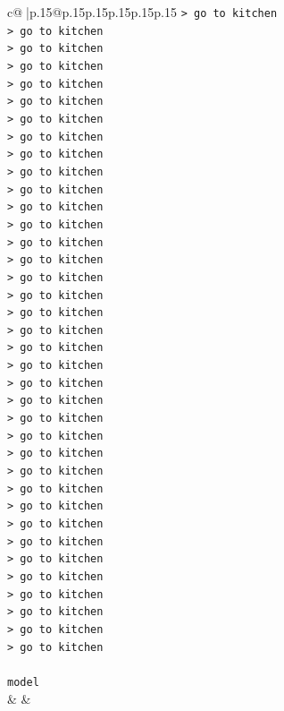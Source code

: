\documentclass{article}
\begin{document}
{\begin{supertabular}{c@{$\;$}|p{.15\linewidth}@{}p{.15\linewidth}p{.15\linewidth}p{.15\linewidth}p{.15\linewidth}p{.15\linewidth}}
{{{\texttt{> go to kitchen} \\
\texttt{> go to kitchen} \\
\texttt{> go to kitchen} \\
\texttt{> go to kitchen} \\
\texttt{> go to kitchen} \\
\texttt{> go to kitchen} \\
\texttt{> go to kitchen} \\
\texttt{> go to kitchen} \\
\texttt{> go to kitchen} \\
\texttt{> go to kitchen} \\
\texttt{> go to kitchen} \\
\texttt{> go to kitchen} \\
\texttt{> go to kitchen} \\
\texttt{> go to kitchen} \\
\texttt{> go to kitchen} \\
\texttt{> go to kitchen} \\
\texttt{> go to kitchen} \\
\texttt{> go to kitchen} \\
\texttt{> go to kitchen} \\
\texttt{> go to kitchen} \\
\texttt{> go to kitchen} \\
\texttt{> go to kitchen} \\
\texttt{> go to kitchen} \\
\texttt{> go to kitchen} \\
\texttt{> go to kitchen} \\
\texttt{> go to kitchen} \\
\texttt{> go to kitchen} \\
\texttt{> go to kitchen} \\
\texttt{> go to kitchen} \\
\texttt{> go to kitchen} \\
\texttt{> go to kitchen} \\
\texttt{> go to kitchen} \\
\texttt{> go to kitchen} \\
\texttt{> go to kitchen} \\
\texttt{> go to kitchen} \\
\texttt{> go to kitchen} \\
\texttt{> go to kitchen} \\
\\ 
\texttt{model} \\
            }
        }
    }
    & & \\ \\


\end{supertabular}}
\end{document}
